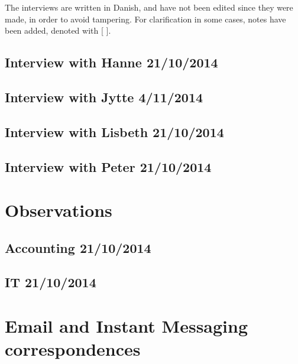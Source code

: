 The interviews are written in Danish, and have not been edited since they were made, in order to avoid tampering.
For clarification in some cases, notes have been added, denoted with [ ].

\section{Interview with Hanne 21/10/2014}

\section{Interview with Jytte 4/11/2014}

\section{Interview with Lisbeth 21/10/2014}

\section{Interview with Peter 21/10/2014}


\chapter{Observations}
\section{Accounting 21/10/2014}

\section{IT 21/10/2014}


\chapter{Email and Instant Messaging correspondences}

